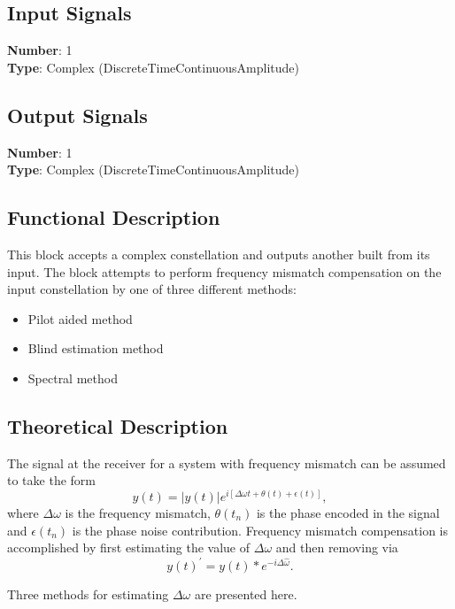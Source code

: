 \begin{refsection}
\subsection*{Input Signals}

\textbf{Number}: 1\\
\textbf{Type}: Complex (DiscreteTimeContinuousAmplitude)


\subsection*{Output Signals}

\textbf{Number}: 1\\
\textbf{Type}: Complex (DiscreteTimeContinuousAmplitude)

\subsection*{Functional Description}

This block accepts a complex constellation and outputs another built from its input. The block attempts to perform frequency mismatch compensation on the input constellation by one of three different methods:
\begin{itemize}
\item Pilot aided method
\item Blind estimation method
\item Spectral method
\end{itemize}

\subsection*{Theoretical Description}



The signal at the receiver for a system with frequency mismatch can be assumed to take the form
\begin{equation}\label{eq:signalWithFrequencyMismatch} 
y(t)=|y(t)|e^{i[\Delta\omega t+\theta(t)+\epsilon(t)]}, 
\end{equation}
where $\Delta\omega$ is the frequency mismatch, $\theta(t_n)$ is the phase encoded in the signal and $\epsilon(t_n)$ is the phase noise contribution.
Frequency mismatch compensation	is accomplished by first estimating the value of $\Delta\omega$ and then removing via
\begin{equation}
y(t)^\prime=y(t)*e^{-i\Delta\hat{\omega}}.
\end{equation}
\par
Three methods for estimating $\Delta\omega$ are presented here.


\end{refsection}
